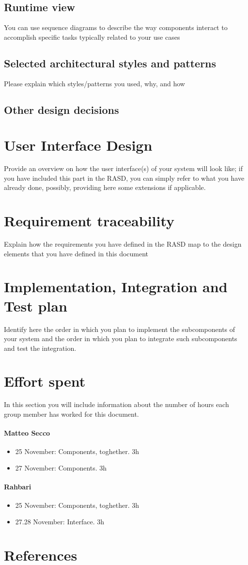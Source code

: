 \documentclass{article}
\begin{document}
	\subsection{Runtime view}	You	can	use	sequence	diagrams	to	describe	the	way	components	interact	
to	accomplish	specific	tasks	typically	related	to	your	use	cases
	\subsection{Selected architectural styles and patterns} Please	explain	which	styles/patterns	you	used,	
why,	and	how
	\subsection{Other design decisions}
\section{User Interface Design}Provide	an	overview	on	how	the	user	interface(s)	of	your	system	will	
look	like; if	you	 have	included	 this	 part	in	 the	 RASD,	you	 can	 simply	 refer	 to	what	you	 have	
already	done,	possibly,	providing	here	some	extensions	if	applicable.
\section{Requirement traceability}	Explain	how	the	requirements	you	have	defined	in	the	RASD	
map	to the	design	elements	that	you	have	defined	in	this	document
\section{Implementation, Integration and Test plan}	Identify	here	the	order	in	which	you	plan	
to	implement	the	subcomponents	of	your	system	and	the	order	in	which	you	plan	to	integrate	
such	subcomponents	and	test	the	integration.	
\section{Effort spent}In	 this	 section	you	will	include	information	about	 the	number	of	hours	each	
group	member	has	worked	for	this	document.
	\paragraph{Matteo Secco}
		\begin{itemize}
			\item 25 November: Components, toghether. 3h
			\item 27 November: Components. 3h
		\end{itemize}
	\paragraph{Rahbari}
		\begin{itemize}
			\item 25 November: Components, toghether. 3h
			\item 27.28 November: Interface. 3h
		\end{itemize}
\section{References}
\end{document}
